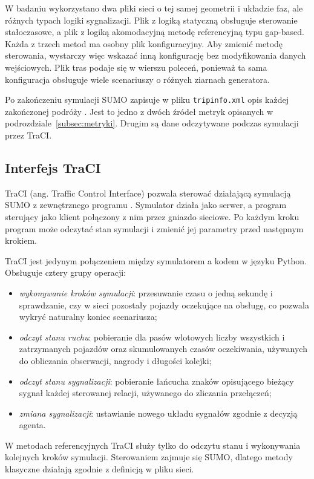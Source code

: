 W badaniu wykorzystano dwa pliki sieci o tej samej geometrii i układzie faz, ale różnych typach logiki sygnalizacji. Plik z logiką statyczną obsługuje sterowanie stałoczasowe, a plik z logiką akomodacyjną metodę referencyjną typu gap-based. Każda z trzech metod ma osobny plik konfiguracyjny. Aby zmienić metodę sterowania, wystarczy więc wskazać inną konfigurację bez modyfikowania danych wejściowych. Plik tras podaje się w wierszu poleceń, ponieważ ta sama konfiguracja obsługuje wiele scenariuszy o różnych ziarnach generatora.

Po zakończeniu symulacji SUMO zapisuje w pliku \texttt{tripinfo.xml} opis każdej zakończonej podróży \cite{sumo_tripinfo_docs}. Jest to jedno z dwóch źródeł metryk opisanych w podrozdziale~\ref{subsec:metryki}. Drugim są dane odczytywane podczas symulacji przez TraCI.

\subsection{Interfejs TraCI}
\label{subsec:traci}

TraCI (ang. Traffic Control Interface) pozwala sterować działającą symulacją SUMO z zewnętrznego programu \cite{sumo_traci_docs}. Symulator działa jako serwer, a program sterujący jako klient połączony z nim przez gniazdo sieciowe. Po każdym kroku program może odczytać stan symulacji i zmienić jej parametry przed następnym krokiem.

TraCI jest jedynym połączeniem między symulatorem a kodem w języku Python. Obsługuje cztery grupy operacji:
\begin{itemize}
    \item \emph{wykonywanie kroków symulacji}: przesuwanie czasu o jedną sekundę i sprawdzanie, czy w sieci pozostały pojazdy oczekujące na obsługę, co pozwala wykryć naturalny koniec scenariusza;
    \item \emph{odczyt stanu ruchu}: pobieranie dla pasów wlotowych liczby wszystkich i zatrzymanych pojazdów oraz skumulowanych czasów oczekiwania, używanych do obliczania obserwacji, nagrody i długości kolejki;
    \item \emph{odczyt stanu sygnalizacji}: pobieranie łańcucha znaków opisującego bieżący sygnał każdej sterowanej relacji, używanego do zliczania przełączeń;
    \item \emph{zmiana sygnalizacji}: ustawianie nowego układu sygnałów zgodnie z decyzją agenta.
\end{itemize}

W metodach referencyjnych TraCI służy tylko do odczytu stanu i wykonywania kolejnych kroków symulacji. Sterowaniem zajmuje się SUMO, dlatego metody klasyczne działają zgodnie z definicją w pliku sieci.

